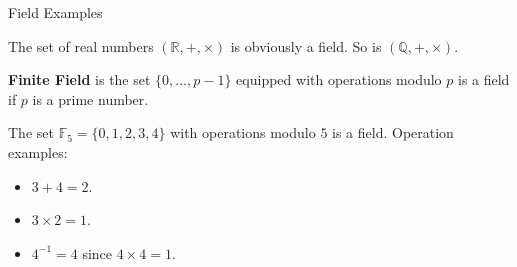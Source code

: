 \documentclass{zkdl-presentation-template}
\begin{document}
    \begin{frame}{Field Examples}
      \begin{example}
        The set of real numbers $(\mathbb{R}, +, \times)$ is obviously a field. So is $(\mathbb{Q}, +, \times)$.\pause
    \end{example}

    \begin{definition}
      \textbf{Finite Field} is the set $\{0,\dots,p-1\}$ equipped with operations modulo $p$ is a field if $p$ is a prime number.\pause
    \end{definition}

    \begin{example}
      The set $\mathbb{F}_5 = \{0,1,2,3,4\}$ with operations modulo $5$ is a field. Operation examples:
      \begin{itemize}
        \item $3 + 4 = 2$.
        \item $3 \times 2 = 1$.
        \item $4^{-1} = 4$ since $4 \times 4 = 1$.
      \end{itemize}
    \end{example}
    \end{frame}

    \makeclosingframe
\end{document}
